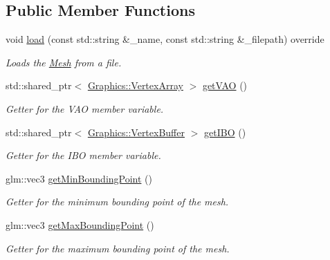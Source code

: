 \subsection*{Public Member Functions}
\begin{DoxyCompactItemize}
\item 
void \hyperlink{struct_cookie_eng_1_1_resources_1_1_mesh_ae31053c6edaf0e735d85350bfa6093fb}{load} (const std\+::string \&\+\_\+name, const std\+::string \&\+\_\+filepath) override
\begin{DoxyCompactList}\small\item\em Loads the \hyperlink{struct_cookie_eng_1_1_resources_1_1_mesh}{Mesh} from a file. \end{DoxyCompactList}\item 
std\+::shared\+\_\+ptr$<$ \hyperlink{class_cookie_eng_1_1_graphics_1_1_vertex_array}{Graphics\+::\+Vertex\+Array} $>$ \hyperlink{struct_cookie_eng_1_1_resources_1_1_mesh_ab61a5cfe63393488dfb17a905e7721d6}{get\+V\+AO} ()
\begin{DoxyCompactList}\small\item\em Getter for the V\+AO member variable. \end{DoxyCompactList}\item 
std\+::shared\+\_\+ptr$<$ \hyperlink{class_cookie_eng_1_1_graphics_1_1_vertex_buffer}{Graphics\+::\+Vertex\+Buffer} $>$ \hyperlink{struct_cookie_eng_1_1_resources_1_1_mesh_a322630a222821c217f45b38c25fafc3a}{get\+I\+BO} ()
\begin{DoxyCompactList}\small\item\em Getter for the I\+BO member variable. \end{DoxyCompactList}\item 
glm\+::vec3 \hyperlink{struct_cookie_eng_1_1_resources_1_1_mesh_af1231ef8a39e13d5a89b0c51ad9e025c}{get\+Min\+Bounding\+Point} ()
\begin{DoxyCompactList}\small\item\em Getter for the minimum bounding point of the mesh. \end{DoxyCompactList}\item 
glm\+::vec3 \hyperlink{struct_cookie_eng_1_1_resources_1_1_mesh_a350bb13cf073b1367212e95060b0eb64}{get\+Max\+Bounding\+Point} ()
\begin{DoxyCompactList}\small\item\em Getter for the maximum bounding point of the mesh. \end{DoxyCompactList}\end{DoxyCompactItemize}
